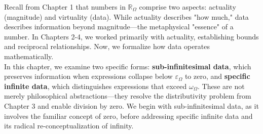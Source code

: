 \documentclass{article}
\begin{document}
Recall from Chapter 1 that numbers in $\mathbb{R}_\Omega$ comprise two aspects: actuality (magnitude) and virtuality (data). While actuality describes "how much," data describes information beyond magnitude---the metaphysical "essence" of a number. In Chapters 2-4, we worked primarily with actuality, establishing bounds and reciprocal relationships. Now, we formalize how data operates mathematically.\\In this chapter, we examine two specific forms: \textbf{sub-infinitesimal data}, which preserves information when expressions collapse below $\varepsilon_\Omega$ to zero, and \textbf{specific infinite data}, which distinguishes expressions that exceed $\omega_\Omega$. These are not merely philosophical abstractions---they resolve the distributivity problem from Chapter 3 and enable division by zero. We begin with sub-infinitesimal data, as it involves the familiar concept of zero, before addressing specific infinite data and its radical re-conceptualization of infinity.
\end{document}
